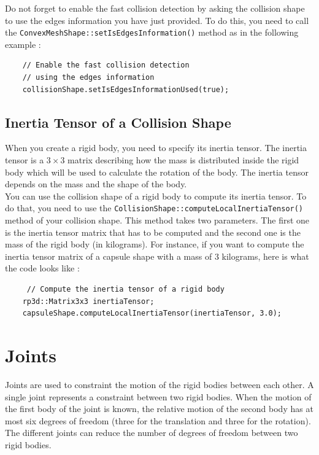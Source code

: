 \documentclass[a4paper,12pt]{article}
\begin{document}
    Do not forget to enable the fast collision detection by asking the collision shape to use the edges information you have just provided. To do this, you need to
    call the \texttt{ConvexMeshShape::setIsEdgesInformation()} method as in the following example : \\

     \begin{lstlisting}
    // Enable the fast collision detection
    // using the edges information
    collisionShape.setIsEdgesInformationUsed(true);
  \end{lstlisting}

    \subsection{Inertia Tensor of a Collision Shape}
    \label{sec:inertiacollisionshape}

    When you create a rigid body, you need to specify its inertia tensor. The inertia tensor is a $3 \times 3$ matrix describing how the mass is distributed inside the rigid body which
    will be used to calculate the rotation of the body. The inertia tensor depends on the mass and the shape of the body. \\

    You can use the collision shape of a rigid body to compute its inertia tensor. To do that, you need to use the \texttt{CollisionShape::computeLocalInertiaTensor()} method of your collision
    shape. This method takes two parameters. The first one is the inertia tensor matrix that has to be computed and the second one is the mass of the rigid body (in kilograms). For instance,
    if you want to compute the inertia tensor matrix of a capsule shape with a mass of 3 kilograms, here is what the code looks like : \\

    \begin{lstlisting}
     // Compute the inertia tensor of a rigid body
    rp3d::Matrix3x3 inertiaTensor;
    capsuleShape.computeLocalInertiaTensor(inertiaTensor, 3.0);
  \end{lstlisting}

    \section{Joints}

    Joints are used to constraint the motion of the rigid bodies between each other. A single joint represents a constraint between two rigid bodies.
    When the motion of the first body of the joint is known, the relative motion of the second body has at most six degrees of freedom (three for the
    translation and three for the rotation). The different joints can reduce the number of degrees of freedom between two rigid bodies. \\
\end{document}
